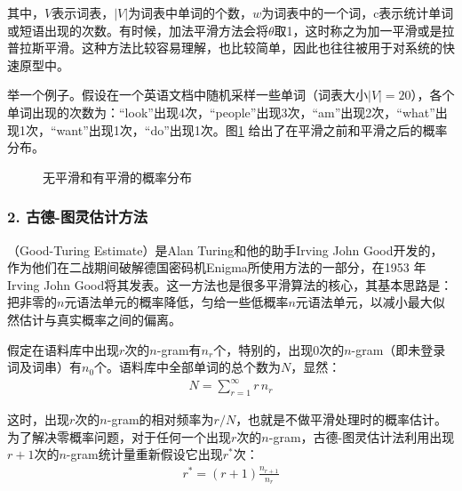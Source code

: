 \noindent 其中，$V$表示词表，$|V|$为词表中单词的个数，$w$为词表中的一个词，c表示统计单词或短语出现的次数。有时候，加法平滑方法会将$\theta$取1，这时称之为加一平滑或是拉普拉斯平滑。这种方法比较容易理解，也比较简单，因此也往往被用于对系统的快速原型中。

\parinterval 举一个例子。假设在一个英语文档中随机采样一些单词（词表大小$|V|=20$），各个单词出现的次数为：“look”出现4次，“people”出现3次，“am”出现2次，“what”出现1次，“want”出现1次，“do”出现1次。图\ref{fig:2-11} 给出了在平滑之前和平滑之后的概率分布。

\begin{figure}[htp]
    \centering
 	
	\caption{无平滑和有平滑的概率分布}
    \label{fig:2-11}
\end{figure}


\subsubsection{2. 古德-图灵估计方法}

\vspace{-0.5em}
（Good-Turing Estimate）是Alan Turing和他的助手Irving John Good开发的，作为他们在二战期间破解德国密码机Enigma所使用方法的一部分，在1953 年Irving John Good将其发表。这一方法也是很多平滑算法的核心，其基本思路是：把非零的$n$元语法单元的概率降低，匀给一些低概率$n$元语法单元，以减小最大似然估计与真实概率之间的偏离。

\parinterval 假定在语料库中出现$r$次的$n$-gram有$n_r$个，特别的，出现0次的$n$-gram（即未登录词及词串）有$n_0$个。语料库中全部单词的总个数为$N$，显然：
\begin{eqnarray}
N = \sum_{r=1}^{\infty}{r\,n_r}
\label{eq:2-28}
\end{eqnarray}

\parinterval 这时，出现$r$次的$n$-gram的相对频率为$r/N$，也就是不做平滑处理时的概率估计。为了解决零概率问题，对于任何一个出现$r$次的$n$-gram，古德-图灵估计法利用出现$r+1$次的$n$-gram统计量重新假设它出现$r^*$次：
\begin{eqnarray}
r^* = (r + 1)\frac{n_{r + 1}}{n_r}
\label{eq:2-29}
\end{eqnarray}

